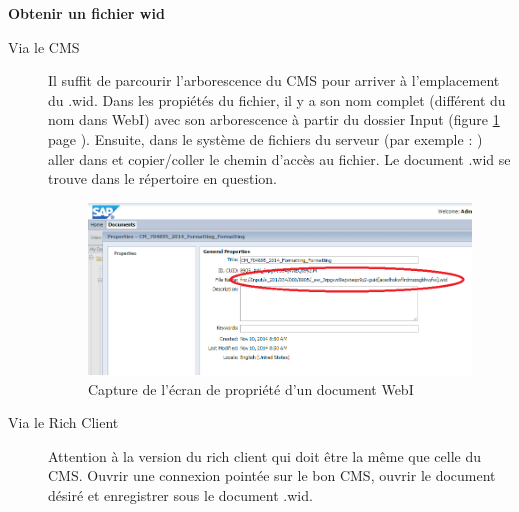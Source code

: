 \textbf{Obtenir un fichier wid}
\begin{description}
	\item	[Via le CMS] 
	\begin{sloppypar}
	Il suffit de parcourir l'arborescence du CMS pour arriver \`{a} l'emplacement du .wid. Dans les propi\'{e}t\'{e}s du fichier, il y a son nom complet (diff\'{e}rent du nom dans WebI) avec son arborescence \`{a} partir du dossier Input (figure \ref{figure:widFileLocation} page \pageref{figure:widFileLocation} ). Ensuite, dans le syst\`{e}me de fichiers du serveur (par exemple : ) aller dans 
	 et copier/coller le chemin d'acc\`{e}s au fichier. Le document .wid se trouve dans le r\'{e}pertoire en question.
	\end{sloppypar}
\begin{figure}[!ht]
  \centering
      \includegraphics[width=\textwidth]{images/widFileLocation.png}
  \caption{Capture de l'\'{e}cran de propri\'{e}t\'{e} d'un document WebI}
	\label{figure:widFileLocation}
\end{figure}
	\item[Via le Rich Client]
	Attention \`{a} la version du rich client qui doit \^{e}tre la m\^{e}me que celle du CMS. Ouvrir une connexion point\'{e}e sur le bon CMS, ouvrir le document d\'{e}sir\'{e} et enregistrer sous le document .wid.
\end{description}

\clearpage
